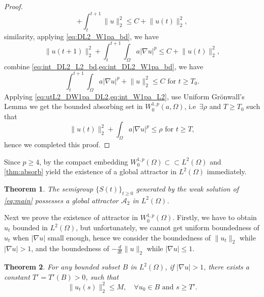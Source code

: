 \documentclass[11pt]{amsart}
\newtheorem{theorem}{Theorem}[section]
\theoremstyle{definition}
\numberwithin{equation}{section}
\newcommand*\abs[1]{\lvert#1\rvert}
\newcommand*\norm[1]{\lVert#1\rVert}
\newcommand*\Brace[1]{\lbrace#1\rbrace}
\begin{document}
\begin{proof}
\begin{equation}
		+ \int_t^{t+1}\norm{u}_2^2
		\leq C + \norm{u(t)}_2^2,
	\end{equation}
	similarity, applying \cref{eq:DL2_W1pa_bd}, we have
	\begin{equation}\label{eq:int_DL2_W1pa_bd}
		\norm{u(t+1)}_2^2
		+ \int_t^{t+1}\int_{\Omega}a \abs{\nabla u}^p
		\leq C + \norm{u(t)}_2^2,
	\end{equation}
	combine \cref{eq:int_DL2_L2_bd,eq:int_DL2_W1pa_bd}, we have
	\begin{equation}\label{eq:int_W1pa_L2}
		\int_t^{t+1}\int_{\Omega}a \abs{\nabla u}^p
		+ \norm{u}_2^2 \leq C \text{ for } t \geq T_0.
	\end{equation}
	Applying \cref{eq:utL2_DW1pa_DL2,eq:int_W1pa_L2}, use Uniform Gr\"onwall's Lemma we get the bounded
	absorbing set in $W_0^{1,p}(a,\Omega)$, i.e\ $\exists \rho$ and $T \geq T_{0}$ such that
	\begin{equation}\label{eq:uL2_W1pa_bd}
		\norm{u(t)}_2^2 + \int_{\Omega}a\abs{\nabla u}^p \leq \rho \text{ for } t \geq T,
	\end{equation}
	hence we completed this proof.
\end{proof}
Since $p \geq 4$, by the compact embedding
$W_0^{1,p}(\Omega) \subset\subset L^2(\Omega)$
and \cref{thm:absorb} yield the existence of a global attractor in $L^2(\Omega)$
immediately.
\begin{theorem}\label{thm:attractor_L2}
	The semigroup $\Brace{S(t)}_{t \geq 0}$ generated by the weak solution of
	\cref{eq:main} possesses a global attractor $\mathcal{A}_2$ in $L^2(\Omega)$.
\end{theorem}
Next we prove the existence of attractor in $W_0^{1,p}(\Omega)$. Firstly, we have
to obtain $u_t$ bounded in $L^2(\Omega)$, but unfortunately, we cannot get
uniform boundedness of $u_t$ when $\abs{\nabla u}$ small enough, hence we consider
the boundedness of $\norm{u_t}_2$ while $\abs{\nabla u} > 1$, and the boundedness
of $-\frac{d}{dt}\norm{u}_2$ while $\abs{\nabla u} \leq 1$.
\begin{theorem}
	For any bounded subset $B$ in $L^2(\Omega)$, if $\abs{\nabla u} > 1$,
	there exists a constant $T' = T'(B) > 0$, such that
	\begin{equation}
		\norm{u_t(s)}_2^2 \leq M, \quad \forall u_0 \in B \text{ and } s \geq T'.
	\end{equation}
\end{theorem}
\end{document}
